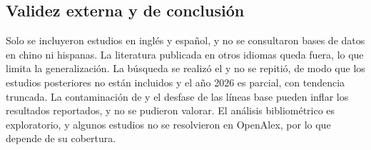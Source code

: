 \subsection{Validez externa y de conclusión}
\label{sec:am-externa}

Solo se incluyeron estudios en inglés y español, y no se consultaron bases de datos en chino ni hispanas. La literatura publicada en otros idiomas queda fuera, lo que limita la generalización. La búsqueda se realizó el \fechaBusqueda{} y no se repitió, de modo que los estudios posteriores no están incluidos y el año 2026 es parcial, con tendencia truncada. La contaminación de  y el desfase de las líneas base pueden inflar los resultados reportados, y no se pudieron valorar. El análisis bibliométrico es exploratorio, y algunos estudios no se resolvieron en OpenAlex, por lo que depende de su cobertura.
